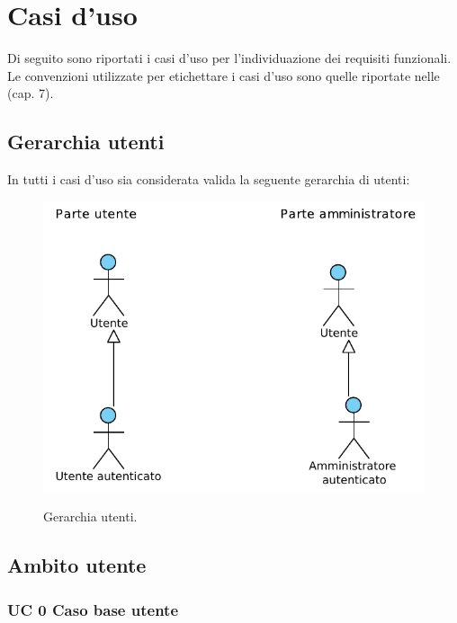 \section{Casi d'uso}
Di seguito sono riportati i casi d'uso per l'individuazione dei requisiti funzionali.\\
Le convenzioni utilizzate per etichettare i casi d'uso sono quelle riportate nelle \emph{\NormeDiProgetto} (cap. 7).\\
\subsection{Gerarchia utenti}
In tutti i casi d'uso sia considerata valida la seguente gerarchia di utenti:

\begin{figure}[htbp]
\centering
\includegraphics[scale=0.7]{./casi_uso/Utenti.pdf}
\label{figUtenti}
\caption{Gerarchia utenti.}
\end{figure}


\newpage

\subsection{Ambito utente}
\subsubsection{UC 0 Caso base utente}
\label{sec:UC0generale}

